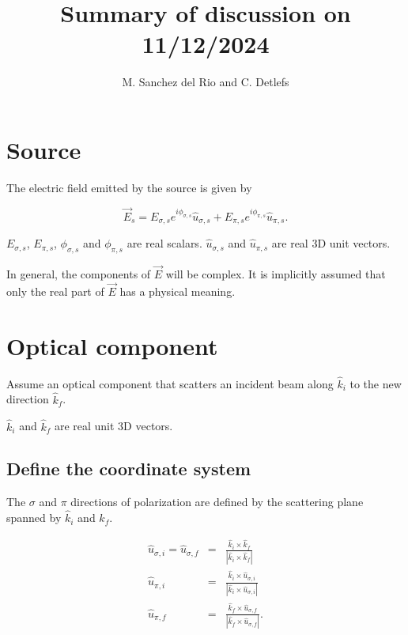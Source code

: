 \documentclass{article}
\begin{document}
\title{Summary of discussion on 11/12/2024}
\author{M. Sanchez del Rio and C. Detlefs}

\section{Source}

The electric field emitted by the source is given by

\begin{equation}
  \vec{E}_s
  =
  E_{\sigma,s} e^{i \phi_{\sigma,s}} \hat{u}_{\sigma,s}
  +
  E_{\pi,s} e^{i \phi_{\pi,s}} \hat{u}_{\pi,s}.
  \label{eq1}
\end{equation}

$E_{\sigma,s}$, $E_{\pi,s}$, $\phi_{\sigma,s}$ and $\phi_{\pi,s}$ are real scalars.
$\hat{u}_{\sigma,s}$ and $\hat{u}_{\pi,s}$ are real 3D unit vectors.

In general, the components of $\vec{E}$ will be complex. It is implicitly assumed that only the real part of $\vec{E}$ has a physical meaning.

\section{Optical component}

Assume an optical component that scatters an incident beam along $\hat{k}_i$ to the new direction $\hat{k}_f$.

$\hat{k}_i$ and $\hat{k}_f$ are real unit 3D vectors.

\subsection{Define the coordinate system}

The $\sigma$ and $\pi$ directions of polarization are defined by the scattering plane spanned by $\hat{k}_i$ and $\hat{k}_f$.

\begin{eqnarray}
  \hat{u}_{\sigma,i} = \hat{u}_{\sigma,f}
  &=&
  \frac{\hat{k}_i \times \hat{k}_f}{\left| \hat{k}_i \times \hat{k}_f \right|}
  \\
  \hat{u}_{\pi,i}
  &=&
  \frac{\hat{k}_i \times \hat{u}_{\sigma,i}}{\left| \hat{k}_i \times \hat{u}_{\sigma,i} \right|}
  \\
  \hat{u}_{\pi,f}
  &=&
  \frac{\hat{k}_f \times \hat{u}_{\sigma,f}}{\left| \hat{k}_f \times \hat{u}_{\sigma,f} \right|}.
\end{eqnarray}
\end{document}

